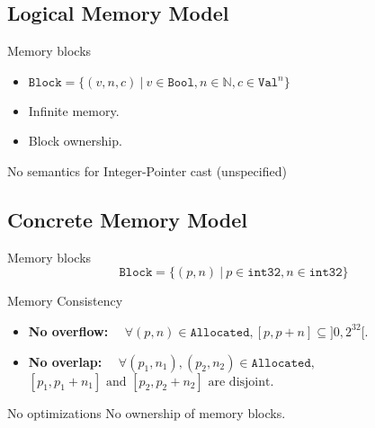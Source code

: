 \subsection{Logical Memory Model}
\begin{frame}{\subsecname}

  \begin{block}{Memory blocks}
    \begin{itemize}
    \item $\texttt{Block}=\{(v,n,c)~|~v\in\texttt{Bool},n\in\mathbb{N},c\in\texttt{Val}^{n}\}$
    \item Infinite memory.
    \item Block ownership.
    \end{itemize}
  \end{block}
  \vfill
  \begin{minipage}{0.48\textwidth}
      
  \end{minipage}
  \begin{minipage}{0.48\textwidth}
      
  \end{minipage}
  \vfill
  \begin{alertblock}{No semantics for Integer-Pointer cast (unspecified)}
  \end{alertblock}
  
\end{frame}

\subsection{Concrete Memory Model}
\begin{frame}{\subsecname}

  \begin{block}{Memory blocks}
    $$\texttt{Block}=\{(p,n)~|~p\in\texttt{int32},n\in\texttt{int32}\}$$
  \end{block}
  \vfill
  \begin{block}{Memory Consistency}
    \begin{itemize}
    \item \textbf{No overflow:} $\quad\forall (p,n)\in\texttt{Allocated}, [p,p+n]\subseteq]0,2^{32}[$.
      \item \textbf{No overlap:} $\quad\forall (p_1,n_1), (p_2,n_2)\in\texttt{Allocated},$\\ $[p_1,p_1+n_1]\text{ and }[p_2,p_2+n_2]\text{ are disjoint.}$
    \end{itemize}
  \end{block}
  \vfill
  \begin{alertblock}{No optimizations}
    No ownership of memory blocks.
  \end{alertblock}

\end{frame}

